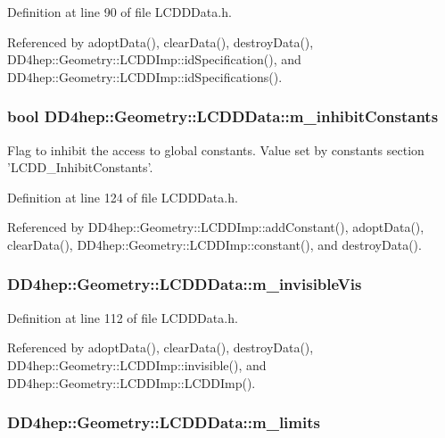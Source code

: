 Definition at line 90 of file LCDDData.h.

Referenced by adoptData(), clearData(), destroyData(), DD4hep::Geometry::LCDDImp::idSpecification(), and DD4hep::Geometry::LCDDImp::idSpecifications().\hypertarget{class_d_d4hep_1_1_geometry_1_1_l_c_d_d_data_a81f222787e773b64fd9c8898f5e0aa9b}{
\subsubsection[{m\_\-inhibitConstants}]{\setlength{\rightskip}{0pt plus 5cm}bool {\bf DD4hep::Geometry::LCDDData::m\_\-inhibitConstants}}}
\label{class_d_d4hep_1_1_geometry_1_1_l_c_d_d_data_a81f222787e773b64fd9c8898f5e0aa9b}


Flag to inhibit the access to global constants. Value set by constants section 'LCDD\_\-InhibitConstants'. 

Definition at line 124 of file LCDDData.h.

Referenced by DD4hep::Geometry::LCDDImp::addConstant(), adoptData(), clearData(), DD4hep::Geometry::LCDDImp::constant(), and destroyData().\hypertarget{class_d_d4hep_1_1_geometry_1_1_l_c_d_d_data_a081b9cb2c89e1b884993c83f78c2c257}{
\subsubsection[{m\_\-invisibleVis}]{ {\bf DD4hep::Geometry::LCDDData::m\_\-invisibleVis}}}
\label{class_d_d4hep_1_1_geometry_1_1_l_c_d_d_data_a081b9cb2c89e1b884993c83f78c2c257}


Definition at line 112 of file LCDDData.h.

Referenced by adoptData(), clearData(), destroyData(), DD4hep::Geometry::LCDDImp::invisible(), and DD4hep::Geometry::LCDDImp::LCDDImp().\hypertarget{class_d_d4hep_1_1_geometry_1_1_l_c_d_d_data_afa9101d1b35276686f9a11f6e0893d0f}{
\subsubsection[{m\_\-limits}]{ {\bf DD4hep::Geometry::LCDDData::m\_\-limits}}}
\label{class_d_d4hep_1_1_geometry_1_1_l_c_d_d_data_afa9101d1b35276686f9a11f6e0893d0f}


